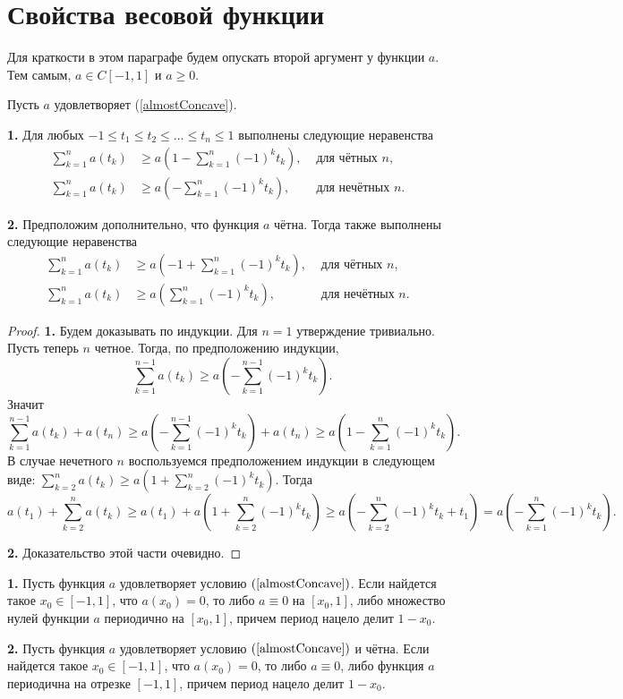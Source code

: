 \section{Свойства весовой функции}


Для краткости в этом параграфе будем опускать второй аргумент у функции $a$.
Тем самым, $a \in C[-1, 1]$ и $a \ge 0$.

\begin{lm}
\label{weightSum}
Пусть $a$ удовлетворяет (\ref{almostConcave}).

\textbf{1.}
Для любых $-1 \le t_1 \le t_2 \le \ldots \le t_n \le 1$ выполнены следующие неравенства
\begin{align*}
\sum_{k = 1}^n a(t_k) & \ge a( 1 - \sum_{k = 1}^n (-1)^k t_k), & \text{ для чётных $n$}, & \\
\sum_{k = 1}^n a(t_k) & \ge a(- \sum_{k = 1}^n (-1)^k t_k), & \text{ для нечётных $n$}. &
\end{align*}

\textbf{2.}
Предположим дополнительно, что функция $a$ чётна.
Тогда также выполнены следующие неравенства
\begin{align*}
\sum_{k = 1}^n a(t_k) & \ge a(-1 + \sum_{k = 1}^n (-1)^k t_k), & \text{ для чётных $n$}, & \\
\sum_{k = 1}^n a(t_k) & \ge a(\sum_{k = 1}^n (-1)^k t_k), & \text{ для нечётных $n$}. &
\end{align*}
\end{lm}

\begin{proof}
\textbf{1.}
Будем доказывать по индукции.
Для $n = 1$ утверждение тривиально.
Пусть теперь $n$ четное.
Тогда, по предположению индукции,
$$\sum_{k=1}^{n - 1} a(t_k) \ge a( -\sum_{k = 1}^{n - 1} (-1)^k t_k ).$$
Значит
$$\sum_{k = 1}^{n - 1} a( t_k ) + a( t_n ) \ge a( -\sum_{k = 1}^{n - 1} (-1)^k t_k ) + a( t_n ) \ge
a( 1 - \sum_{k = 1}^{n} (-1)^k t_k ).$$
В случае нечетного $n$ воспользуемся предположением индукции в следующем виде:
$\sum_{k=2}^n a(t_k) \ge a( 1 + \sum_{k = 2}^n (-1)^k t_k )$.
Тогда
$$
a( t_1 ) + \sum_{k = 2}^n a( t_k ) \ge a( t_1 ) + a( 1 + \sum_{k = 2}^{n} (-1)^k t_k ) \ge
a( -\sum_{k = 2}^{n} (-1)^k t_k + t_1 ) = a( -\sum_{k = 1}^{n} (-1)^k t_k ).
$$

\textbf{2.} Доказательство этой части очевидно.
\end{proof}

\begin{lm}
\label{periodicity}
\textbf{1.}
Пусть функция $a$ удовлетворяет условию $(\ref{almostConcave})$.
Если найдется такое $x_0 \in [-1, 1]$, что $a(x_0) = 0$,
то либо $a \equiv 0$ на $[x_0, 1]$,
либо множество нулей функции $a$ периодично на $[x_0, 1]$, причем период нацело делит $1 - x_0$.

\textbf{2.}
Пусть функция $a$ удовлетворяет условию $(\ref{almostConcave})$ и чётна.
Если найдется такое $x_0 \in [-1, 1]$, что $a(x_0) = 0$,
то либо $a \equiv 0$,
либо функция $a$ периодична на отрезке $[-1, 1]$, причем период нацело делит $1 - x_0$.
\end{lm}

